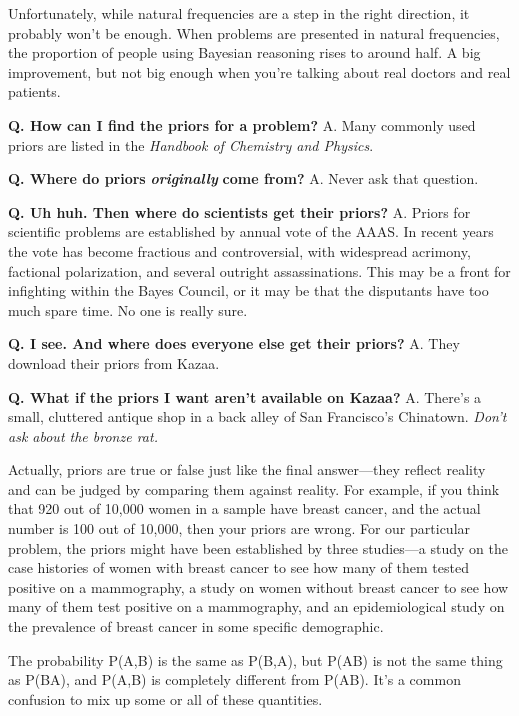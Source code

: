 {
 Unfortunately, while natural frequencies are a step in the right
direction, it probably won't be enough. When problems
are presented in natural frequencies, the proportion of people using
Bayesian reasoning rises to around half. A big improvement, but not big
enough when you're talking about real doctors and real
patients.}

{
 \textbf{Q. How can I find the priors for a problem?}\newline
 A. Many commonly used priors are listed in the \textit{Handbook of
Chemistry and Physics}.}

{
 \textbf{Q. Where do priors }\textbf{\textit{originally}}\textbf{
come from?}\newline
 A. Never ask that question.}

{
 \textbf{Q. Uh huh. Then where do scientists get their
priors?}\newline
 A. Priors for scientific problems are established by annual vote of the
AAAS. In recent years the vote has become fractious and controversial,
with widespread acrimony, factional polarization, and several outright
assassinations. This may be a front for infighting within the Bayes
Council, or it may be that the disputants have too much spare time. No
one is really sure.}

{
 \textbf{Q. I see. And where does everyone else get their
priors?}\newline
 A. They download their priors from Kazaa.}

{
 \textbf{Q. What if the priors I want aren't
available on Kazaa?}\newline
 A. There's a small, cluttered antique shop in a back
alley of San Francisco's Chinatown.
\textit{Don't ask about the bronze rat.}}

{
 Actually, priors are true or false just like the final
answer---they reflect reality and can be judged by comparing them
against reality. For example, if you think that 920 out of 10,000 women
in a sample have breast cancer, and the actual number is 100 out of
10,000, then your priors are wrong. For our particular problem, the
priors might have been established by three studies---a study on the
case histories of women with breast cancer to see how many of them
tested positive on a mammography, a study on women without breast
cancer to see how many of them test positive on a mammography, and an
epidemiological study on the prevalence of breast cancer in some
specific demographic.}

{
 The probability P(A,B) is the same as P(B,A), but P(A{\textbar}B)
is not the same thing as P(B{\textbar}A), and P(A,B) is completely
different from P(A{\textbar}B). It's a common confusion
to mix up some or all of these quantities.}

